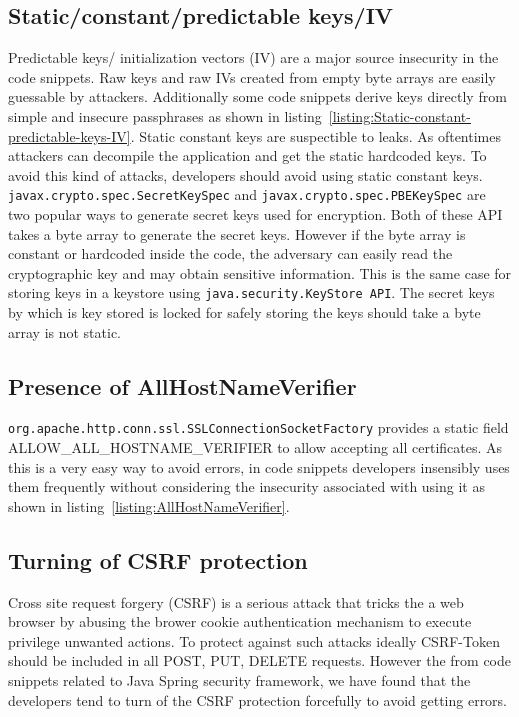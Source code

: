 \subsection{Static/constant/predictable keys/IV }
Predictable keys/ initialization vectors (IV) are a major source insecurity in the code snippets. 
Raw keys and raw IVs created from empty byte arrays
are easily guessable by attackers. 
Additionally some code snippets derive keys directly from simple and insecure passphrases as shown in listing~\ref{listing:Static-constant-predictable-keys-IV}. 
Static constant keys are suspectible to leaks. As oftentimes attackers can decompile the application and get the static hardcoded keys.  To avoid this kind of attacks, developers should avoid using static constant keys. \texttt{javax.crypto.spec.SecretKeySpec} and \texttt{javax.crypto.spec.\-PBEKeySpec} are two popular ways to generate secret keys used for encryption. Both of these API takes a byte array to generate the secret keys. However if the byte array is constant or hardcoded inside the code, the adversary can easily read the cryptographic key and may obtain sensitive information. This is the same case for storing keys in a keystore using \texttt{java.security.KeyStore API}. The secret keys by which is key stored is locked for safely storing the keys should take a byte array is not static.


\subsection{Presence of AllHostNameVerifier}
\texttt{org.apache.http.conn.ssl.SSLConnectionSocketFactory} provides  a static field ALLOW\_ALL\_HOSTNAME\_VERIFIER to allow accepting all certificates.  
As this is a very easy way to avoid errors, in code snippets developers insensibly uses them frequently without considering the insecurity associated with using it as shown in listing~\ref{listing:AllHostNameVerifier}.

\subsection{Turning of CSRF protection}
Cross site request forgery (CSRF) is a serious attack that tricks the a web browser by abusing the brower cookie authentication mechanism to execute privilege unwanted actions. To protect against such attacks ideally CSRF-Token should be included in all POST, PUT, DELETE requests.
However the from code snippets related to Java Spring security framework, we have found that the developers tend to turn of the CSRF protection forcefully to avoid getting errors. 
